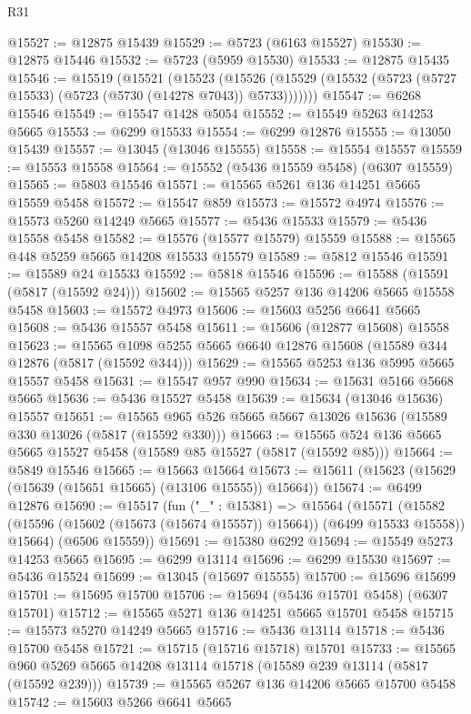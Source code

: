 \begin{lexlean}{R31}
\begin{coremodule}
@15527 := @12875 @15439
@15529 := @5723 (@6163 @15527)
@15530 := @12875 @15446
@15532 := @5723 (@5959 @15530)
@15533 := @12875 @15435
@15546 := @15519
    (@15521
      (@15523
        (@15526 (@15529 (@15532 (@5723 (@5727 @15533) (@5723 (@5730 (@14278 @7043)) @5733)))))))
@15547 := @6268 @15546
@15549 := @15547 @1428 @5054
@15552 := @15549 @5263 @14253 @5665
@15553 := @6299 @15533
@15554 := @6299 @12876
@15555 := @13050 @15439
@15557 := @13045 (@13046 @15555)
@15558 := @15554 @15557
@15559 := @15553 @15558
@15564 := @15552 (@5436 @15559 @5458) (@6307 @15559)
@15565 := @5803 @15546
@15571 := @15565 @5261 @136 @14251 @5665 @15559 @5458
@15572 := @15547 @859
@15573 := @15572 @4974
@15576 := @15573 @5260 @14249 @5665
@15577 := @5436 @15533
@15579 := @5436 @15558 @5458
@15582 := @15576 (@15577 @15579) @15559
@15588 := @15565 @448 @5259 @5665 @14208 @15533 @15579
@15589 := @5812 @15546
@15591 := @15589 @24 @15533
@15592 := @5818 @15546
@15596 := @15588 (@15591 (@5817 (@15592 @24)))
@15602 := @15565 @5257 @136 @14206 @5665 @15558 @5458
@15603 := @15572 @4973
@15606 := @15603 @5256 @6641 @5665
@15608 := @5436 @15557 @5458
@15611 := @15606 (@12877 @15608) @15558
@15623 := @15565 @1098 @5255 @5665 @6640 @12876 @15608 (@15589 @344 @12876 (@5817 (@15592 @344)))
@15629 := @15565 @5253 @136 @5995 @5665 @15557 @5458
@15631 := @15547 @957 @990
@15634 := @15631 @5166 @5668 @5665
@15636 := @5436 @15527 @5458
@15639 := @15634 (@13046 @15636) @15557
@15651 := @15565 @965 @526 @5665 @5667 @13026 @15636 (@15589 @330 @13026 (@5817 (@15592 @330)))
@15663 := @15565 @524 @136 @5665 @5665 @15527 @5458 (@15589 @85 @15527 (@5817 (@15592 @85)))
@15664 := @5849 @15546
@15665 := @15663 @15664
@15673 := @15611 (@15623 (@15629 (@15639 (@15651 @15665) (@13106 @15555)) @15664))
@15674 := @6499 @12876
@15690 := @15517
    (fun ("_" : @15381) =>
    @15564
      (@15571
        (@15582 (@15596 (@15602 (@15673 (@15674 @15557)) @15664)) (@6499 @15533 @15558))
        @15664)
      (@6506 @15559))
@15691 := @15380 @6292
@15694 := @15549 @5273 @14253 @5665
@15695 := @6299 @13114
@15696 := @6299 @15530
@15697 := @5436 @15524
@15699 := @13045 (@15697 @15555)
@15700 := @15696 @15699
@15701 := @15695 @15700
@15706 := @15694 (@5436 @15701 @5458) (@6307 @15701)
@15712 := @15565 @5271 @136 @14251 @5665 @15701 @5458
@15715 := @15573 @5270 @14249 @5665
@15716 := @5436 @13114
@15718 := @5436 @15700 @5458
@15721 := @15715 (@15716 @15718) @15701
@15733 := @15565 @960 @5269 @5665 @14208 @13114 @15718 (@15589 @239 @13114 (@5817 (@15592 @239)))
@15739 := @15565 @5267 @136 @14206 @5665 @15700 @5458
@15742 := @15603 @5266 @6641 @5665

\end{coremodule}
\end{lexlean}
